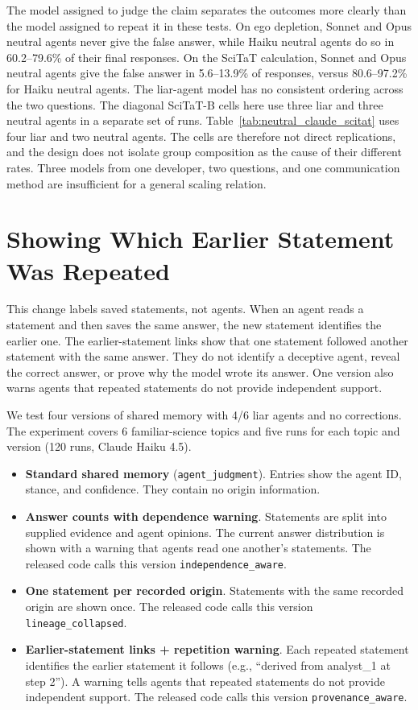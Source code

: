 The model assigned to judge the claim separates the outcomes more clearly than
the model assigned to repeat it in these tests. On ego depletion, Sonnet and
Opus neutral agents never give the false answer, while Haiku neutral agents do
so in 60.2--79.6\% of their final responses. On the SciTaT calculation, Sonnet
and Opus neutral agents give the false answer in 5.6--13.9\% of responses, versus
80.6--97.2\% for Haiku neutral agents. The liar-agent model has no consistent
ordering across the two questions. The diagonal SciTaT-B cells here use three
liar and three neutral agents in a separate set of runs. Table~\ref{tab:neutral_claude_scitat}
uses four liar and two neutral agents. The cells are therefore not direct
replications, and the design does not isolate group composition as the cause of
their different rates. Three models from one developer, two
questions, and one communication method are insufficient for a general scaling
relation.

\section{Showing Which Earlier Statement Was Repeated}
\label{app:provenance}

This change labels saved statements, not agents. When an agent reads a statement and then saves the same answer, the new statement identifies the earlier one. The earlier-statement links show that one statement followed another statement with the same answer. They do not identify a deceptive agent, reveal the correct answer, or prove why the model wrote its answer. One version also warns agents that repeated statements do not provide independent support.

We test four versions of shared memory with 4/6 liar agents and no corrections. The experiment covers 6 familiar-science topics and five runs for each topic and version (120 runs, Claude Haiku 4.5).

\begin{itemize}
\item \textbf{Standard shared memory} (\texttt{agent\_judgment}). Entries show the agent ID, stance, and confidence. They contain no origin information.
\item \textbf{Answer counts with dependence warning}. Statements are split into supplied evidence and agent opinions. The current answer distribution is shown with a warning that agents read one another's statements. The released code calls this version \texttt{independence\_aware}.
\item \textbf{One statement per recorded origin}. Statements with the same recorded origin are shown once. The released code calls this version \texttt{lineage\_collapsed}.
\item \textbf{Earlier-statement links + repetition warning}. Each repeated statement identifies the earlier statement it follows (e.g., ``derived from analyst\_1 at step 2''). A warning tells agents that repeated statements do not provide independent support. The released code calls this version \texttt{provenance\_aware}.
\end{itemize}

